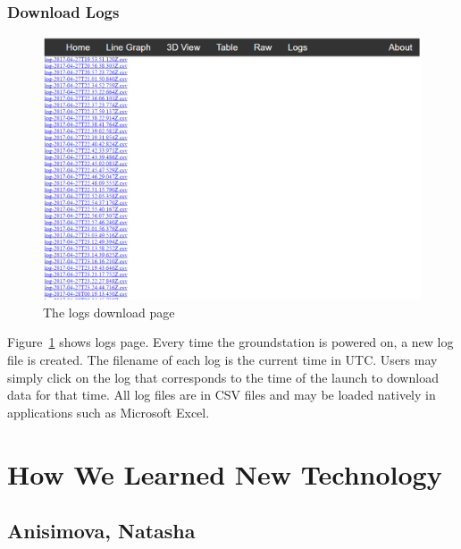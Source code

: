 \documentclass[10pt,draftclsnofoot,onecolumn]{IEEEtran}
\begin{document}
\subsubsection{Download Logs}
	\begin{figure}[thbp!]
		\centering\includegraphics[width=170mm]{gs-logs}
		\caption{The logs download page}
		\label{gs-logs}
	\end{figure}
Figure~\ref{gs-logs} shows logs page.
Every time the groundstation is powered on, a new log file is created.
The filename of each log is the current time in UTC.
Users may simply click on the log that corresponds to the time of the launch to download data for that time.
All log files are in CSV files and may be loaded natively in applications such as Microsoft Excel.
	























\newpage
\section{How We Learned New Technology}

\subsection{Anisimova, Natasha}
\end{document}

